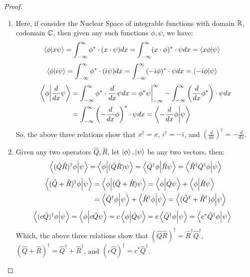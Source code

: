 \documentclass{article}
\begin{document}
\begin{proof}

    \hfil

    \begin{enumerate}
        \item Here, if consider the Nuclear Space of integrable functions with domain $\mathbb{R}$, codomain $\mathbb{C}$, then given any such functions $\phi,\psi$, we have:
        \begin{align}
            \braket{\phi}{x\psi} &= \int_{-\infty}^{\infty}\phi^* \cdot (x\cdot \psi) dx = \int_{-\infty}^{\infty} (x\cdot \phi)^* \cdot \psi dx = \braket{x\phi}{\psi}
        \end{align}
        \begin{align}
            \braket{\phi}{i\psi} &= \int_{-\infty}^{\infty}\phi^* \cdot (i\psi)dx = \int_{-\infty}^{\infty}(-i\phi)^*\cdot \psi dx=\braket{-i\phi}{\psi}
        \end{align}
        \begin{align}
            \braket{\phi}{\frac{d}{dx}\psi} &= \int_{-\infty}^{\infty}\phi^* \cdot \frac{d}{dx}\psi dx = \phi^*\psi\bigg|_{-\infty}^{\infty}-\int_{-\infty}^{\infty}\left(\frac{d}{dx}\phi^*\right)\cdot \psi dx\\
            &= \int_{-\infty}^{\infty}\left(-\frac{d}{dx}\phi\right)^* \cdot \psi dx = \braket{-\frac{d}{dx}\phi}{\psi}
        \end{align}
        So, the above three relations show that $x^\dagger = x$, $i^\dagger = -i$, and $\left(\frac{d}{dx}\right)^\dagger = -\frac{d}{dx}$.

        \hfil

        \item Given any two operators $\hat{Q},\hat{R}$, let $\ket{\phi},\ket{\psi}$ be any two vectors, then:
        \begin{align}
            \braket{(\hat{Q}\hat{R})^\dagger \phi}{\psi}=\braket{\phi}{(\hat{Q}\hat{R})\psi} = \braket{\hat{Q}^\dagger \phi}{\hat{R}\psi} = \braket{\hat{R}^\dagger \hat{Q}^\dagger \phi}{\psi}
        \end{align}
        \begin{align}
            \braket{(\hat{Q}+\hat{R})^\dagger \phi}{\psi}&=\braket{\phi}{(\hat{Q}+\hat{R})\psi}=\braket{\phi}{\hat{Q}\psi}+\braket{\phi}{\hat{R}\psi}\\
            &= \braket{\hat{Q}^\dagger \phi}{\psi}+\braket{\hat{R}^\dagger \phi}{\psi} = \braket{(\hat{Q}^\dagger+\hat{R}^\dagger)\phi}{\psi}
        \end{align}
        \begin{align}
            \braket{(c\hat{Q})^\dagger \phi}{\psi}&= \braket{\phi}{c\hat{Q}\psi} = c\braket{\phi}{\hat{ Q}\psi} = c\braket{\hat{Q}^\dagger\phi}{\psi} = \braket{c^*\hat{Q}^\dagger \phi}{\psi}
        \end{align}
        Which, the above three relations show that $(\hat{Q}\hat{R})^\dagger = \hat{R}^\dagger \hat{Q}^\dagger$, $(\hat{Q}+\hat{R})^\dagger = \hat{Q}^\dagger+\hat{R}^\dagger$, and $(c\hat{Q})^\dagger = c^* \hat{Q}^\dagger$.


\end{enumerate}
\end{proof}
\end{document}
